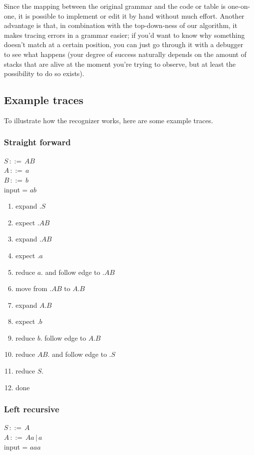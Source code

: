 \documentclass[a4paper,10pt]{article}
\begin{document}
Since the mapping between the original grammar and the code or table is one-on-one, it is possible to implement or edit it by hand without much effort. Another advantage is that, in combination with the top-down-ness of our algorithm, it makes tracing errors in a grammar easier; if you'd want to know why something doesn't match at a certain position, you can just go through it with a debugger to see what happens (your degree of success naturally depends on the amount of stacks that are alive at the moment you're trying to observe, but at least the possibility to do so exists).

\subsection{Example traces}

To illustrate how the recognizer works, here are some example traces.

\subsubsection{Straight forward}
$S\,::=\,AB$\\
$A\,::=\,a$\\
$B\,::=\,b$\\
input = $ab$

\begin{enumerate}
 \setlength{\itemsep}{0pt}
 \setlength{\parskip}{0pt}
 \setlength{\parsep}{0pt}
 
 \item expand $.S$
 \item expect $.AB$
 \item expand $.AB$
 \item expect $.a$
 \item reduce $a.$ and follow edge to $.AB$
 \item move from $.AB$ to $A.B$
 \item expand $A.B$
 \item expect $.b$
 \item reduce $b.$ follow edge to $A.B$
 \item reduce $AB.$ and follow edge to $.S$
 \item reduce $S.$
 \item done
\end{enumerate}

\subsubsection{Left recursive}
$S\,::=\,A$\\
$A\,::=\,Aa\,|\,a$\\
input = $aaa$
\end{document}

